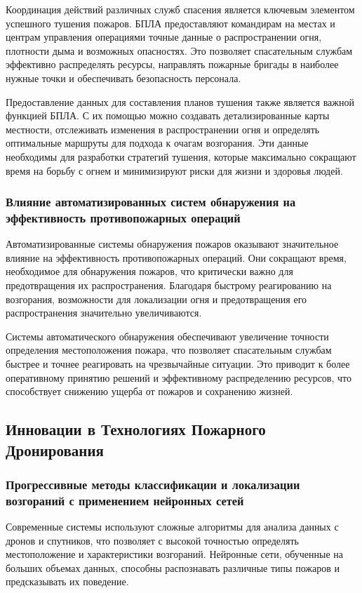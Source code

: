 Координация действий различных служб спасения является ключевым элементом успешного тушения пожаров. БПЛА предоставляют командирам на местах и центрам управления операциями точные данные о распространении огня, плотности дыма и возможных опасностях. Это позволяет спасательным службам эффективно распределять ресурсы, направлять пожарные бригады в наиболее нужные точки и обеспечивать безопасность персонала.

Предоставление данных для составления планов тушения также является важной функцией БПЛА. С их помощью можно создавать детализированные карты местности, отслеживать изменения в распространении огня и определять оптимальные маршруты для подхода к очагам возгорания. Эти данные необходимы для разработки стратегий тушения, которые максимально сокращают время на борьбу с огнем и минимизируют риски для жизни и здоровья людей.
\subsubsection{Влияние автоматизированных систем обнаружения на эффективность противопожарных операций}
Автоматизированные системы обнаружения пожаров оказывают значительное влияние на эффективность противопожарных операций. Они сокращают время, необходимое для обнаружения пожаров, что критически важно для предотвращения их распространения. Благодаря быстрому реагированию на возгорания, возможности для локализации огня и предотвращения его распространения значительно увеличиваются.

Системы автоматического обнаружения обеспечивают увеличение точности определения местоположения пожара, что позволяет спасательным службам быстрее и точнее реагировать на чрезвычайные ситуации. Это приводит к более оперативному принятию решений и эффективному распределению ресурсов, что способствует снижению ущерба от пожаров и сохранению жизней.
\subsection{Инновации в Технологиях Пожарного Дронирования}
\subsubsection{Прогрессивные методы классификации и локализации возгораний с применением нейронных сетей}
Современные системы используют сложные алгоритмы для анализа данных с дронов и спутников, что позволяет с высокой точностью определять местоположение и характеристики возгораний. Нейронные сети, обученные на больших объемах данных, способны распознавать различные типы пожаров и предсказывать их поведение.

